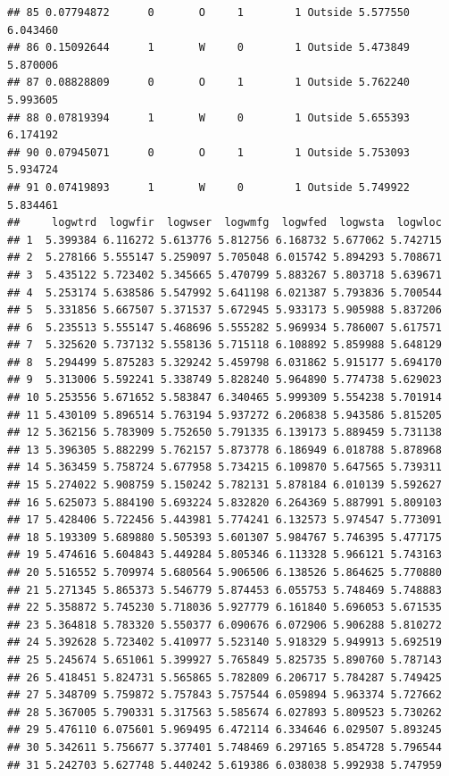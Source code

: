 \documentclass[]{article}
\begin{document}
\begin{verbatim}
## 85 0.07794872      0       O     1        1 Outside 5.577550 6.043460
## 86 0.15092644      1       W     0        1 Outside 5.473849 5.870006
## 87 0.08828809      0       O     1        1 Outside 5.762240 5.993605
## 88 0.07819394      1       W     0        1 Outside 5.655393 6.174192
## 90 0.07945071      0       O     1        1 Outside 5.753093 5.934724
## 91 0.07419893      1       W     0        1 Outside 5.749922 5.834461
##     logwtrd  logwfir  logwser  logwmfg  logwfed  logwsta  logwloc
## 1  5.399384 6.116272 5.613776 5.812756 6.168732 5.677062 5.742715
## 2  5.278166 5.555147 5.259097 5.705048 6.015742 5.894293 5.708671
## 3  5.435122 5.723402 5.345665 5.470799 5.883267 5.803718 5.639671
## 4  5.253174 5.638586 5.547992 5.641198 6.021387 5.793836 5.700544
## 5  5.331856 5.667507 5.371537 5.672945 5.933173 5.905988 5.837206
## 6  5.235513 5.555147 5.468696 5.555282 5.969934 5.786007 5.617571
## 7  5.325620 5.737132 5.558136 5.715118 6.108892 5.859988 5.648129
## 8  5.294499 5.875283 5.329242 5.459798 6.031862 5.915177 5.694170
## 9  5.313006 5.592241 5.338749 5.828240 5.964890 5.774738 5.629023
## 10 5.253556 5.671652 5.583847 6.340465 5.999309 5.554238 5.701914
## 11 5.430109 5.896514 5.763194 5.937272 6.206838 5.943586 5.815205
## 12 5.362156 5.783909 5.752650 5.791335 6.139173 5.889459 5.731138
## 13 5.396305 5.882299 5.762157 5.873778 6.186949 6.018788 5.878968
## 14 5.363459 5.758724 5.677958 5.734215 6.109870 5.647565 5.739311
## 15 5.274022 5.908759 5.150242 5.782131 5.878184 6.010139 5.592627
## 16 5.625073 5.884190 5.693224 5.832820 6.264369 5.887991 5.809103
## 17 5.428406 5.722456 5.443981 5.774241 6.132573 5.974547 5.773091
## 18 5.193309 5.689880 5.505393 5.601307 5.984767 5.746395 5.477175
## 19 5.474616 5.604843 5.449284 5.805346 6.113328 5.966121 5.743163
## 20 5.516552 5.709974 5.680564 5.906506 6.138526 5.864625 5.770880
## 21 5.271345 5.865373 5.546779 5.874453 6.055753 5.748469 5.748883
## 22 5.358872 5.745230 5.718036 5.927779 6.161840 5.696053 5.671535
## 23 5.364818 5.783320 5.550377 6.090676 6.072906 5.906288 5.810272
## 24 5.392628 5.723402 5.410977 5.523140 5.918329 5.949913 5.692519
## 25 5.245674 5.651061 5.399927 5.765849 5.825735 5.890760 5.787143
## 26 5.418451 5.824731 5.565865 5.782809 6.206717 5.784287 5.749425
## 27 5.348709 5.759872 5.757843 5.757544 6.059894 5.963374 5.727662
## 28 5.367005 5.790331 5.317563 5.585674 6.027893 5.809523 5.730262
## 29 5.476110 6.075601 5.969495 6.472114 6.334646 6.029507 5.893245
## 30 5.342611 5.756677 5.377401 5.748469 6.297165 5.854728 5.796544
## 31 5.242703 5.627748 5.440242 5.619386 6.038038 5.992938 5.747959

\end{verbatim}
\end{document}
